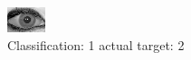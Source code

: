 \begin{figure}[h!]
\begin{center}
\includegraphics[width=0.60\columnwidth]{figures/ID2019_class_1_target_2.png}
\end{center}
\caption{ Classification: 1 actual target: 2}
\label{fig:ID2019_class_1_target_2}
\end{figure}
